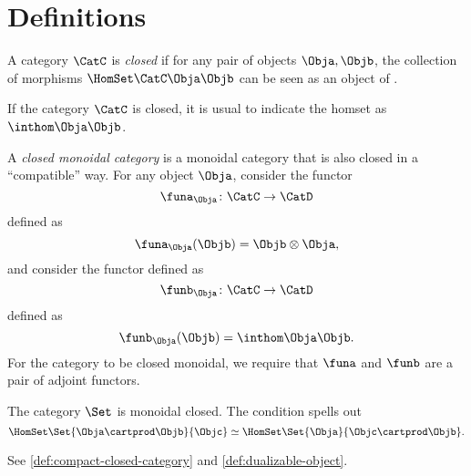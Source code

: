 \section{Definitions}

\begin{definition}
    \label{def:closed-category}
    A category $\CatC$ is \emph{closed} if for any pair of objects $\Obja,\Objb$,
    the collection of morphisms $\HomSet\CatC\Obja\Objb$ can be seen as an object of
    \CatC.

    If the category $\CatC$ is closed, it is usual to indicate the homset as $\inthom\Obja\Objb$.

\end{definition}

\begin{definition}
    \label{def:closed-monoidal-category}
    A \emph{closed monoidal category} is a monoidal category that is also closed
    in a ``compatible'' way.
    For any object $\Obja$, consider the functor
    \begin{equation}
        \funa_{\Obja} \colon \CatC \to \CatD
    \end{equation}
    defined as
    \begin{equation}
        \funa_{\Obja}(\Objb) = \Objb \otimes \Obja,
    \end{equation}
    and consider the functor defined as
    \begin{equation}
        \funb_{\Obja} \colon \CatC \to \CatD
    \end{equation}
    defined as
    \begin{equation}
        \funb_{\Obja}(\Objb) = \inthom\Obja\Objb.
    \end{equation}
    For the category to be closed monoidal, we require that $\funa$ and $\funb$ are a pair of adjoint functors.
\end{definition}

\begin{example}
    The category $\Set$ is monoidal closed.
    The condition
    spells out
    \begin{equation}
        \HomSet\Set{\Obja\cartprod\Objb}{\Objc} \simeq \HomSet\Set{\Obja}{\Objc\cartprod\Objb}.
    \end{equation}

\end{example}

See \cref{def:compact-closed-category} and \cref{def:dualizable-object}.

